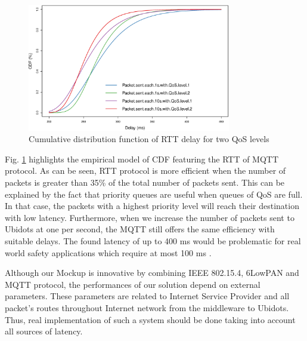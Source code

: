 \documentclass[conference]{../../setup/IEEEtran}
\makeatletter
\def\blue#1{\textcolor{beamer@blendedblue}{#1}}
\makeatother
\begin{document}
\begin{figure}[!htb]
\centering
\includegraphics[width=3.5in]{res/cdf_v3.eps}
\caption{Cumulative distribution function of RTT delay for two QoS levels}
\label{fig:cdf.pdf}
\end{figure}

Fig. \ref{fig:cdf.pdf} highlights the empirical model of CDF featuring the RTT of MQTT protocol. As can be seen, RTT protocol is more efficient when the number of packets is greater than 35\% of the total number of packets sent. This can be explained by the fact that priority queues are useful when queues of QoS are full. In that case, the packets with a highest priority level will reach their destination with low latency. Furthermore, when we increase the number of packets sent to Ubidots at one per second, the MQTT still offers the same efficiency with suitable delays. The found latency of up to 400 ms would be problematic for real world safety applications which require at most 100 ms \cite{Chen2017}.

Although our Mockup is innovative by combining IEEE 802.15.4, 6LowPAN and MQTT protocol, the performances of our solution depend on external parameters.  These parameters are related to Internet Service Provider and all packet's routes throughout Internet network from the middleware to Ubidots. Thus, real implementation of such a system should be done taking into account all sources of latency. 

\end{document}
